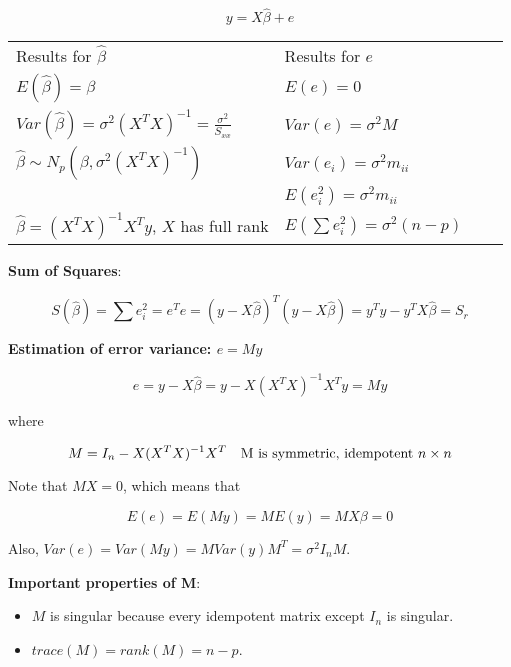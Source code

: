\documentclass[10pt,landscape]{article}
\begin{document}
\begin{multicols}{3}
\begin{equation}
y = X\hat{\beta} + e
\end{equation}

\begin{tabular}{@{}ll@{}ll@{}}
Results for $\hat{\beta}$ & Results for $e$\\
$E(\hat{\beta}) = \beta$ & $E(e) = 0$\\
$Var(\hat{\beta}) = \sigma^2 (X^T X)^{-1} = \frac{\sigma^2}{S_{xx}}$ & $Var(e)=\sigma^2 M$  \\
$\hat{\beta} \sim N_p(\beta,\sigma^2 (X^T X)^{-1})$ & $Var(e_i)=\sigma^2 m_{ii} $\\ 
&  $E(e_i^2)= \sigma^2 m_{ii}$\\
$\hat{\beta} = (X^T X)^{-1} X^T y$, $X$ has full rank  & $E(\sum e_i^2) = \sigma^2 (n-p)$\\
\end{tabular}

\medskip
\textbf{Sum of Squares}:

\begin{equation}
S(\hat{\beta}) = \sum e_i^2 = e^T e = (y-X\hat{\beta})^T (y-X\hat{\beta})  = y^T y - y^T X \hat{\beta} = S_r
\end{equation}

\textbf{Estimation of error variance: $e=My$}

\begin{equation}
e = y - X\hat{\beta} = y - X (X^T X)^{-1} X^T y = My
\end{equation}

\noindent
where

\begin{equation}
M = I_n -  X (X^T X)^{-1} X^T \quad \hbox{M is symmetric, idempotent } n\times n
\end{equation}

Note that $MX=0$, which means that 

\begin{equation}
E(e)=E(My) = ME(y)= MX\beta = 0
\end{equation}

Also, $Var(e) = Var(My) = M Var(y) M^T = \sigma^2 I_n M$.

\medskip
\textbf{Important properties of M}:

\begin{itemize}
\item $M$ is singular because every idempotent matrix except $I_n$ is singular.
\item $trace(M)=rank(M)=n-p$.
\end{itemize}


\end{multicols}
\end{document}
